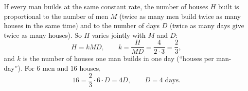 If every man builds at the same constant rate, the number of houses $H$ built is proportional to the number of men $M$ (twice as many men build twice as many houses in the same time) and to the number of days $D$ (twice as many days give twice as many houses). So $H$ varies jointly with $M$ and $D$:
\[H=kMD,\qquad k=\dfrac{H}{MD}=\dfrac{4}{2\cdot3}=\dfrac23,\]
and $k$ is the number of houses one man builds in one day (``houses per man-day''). For $6$ men and $16$ houses,
\[16=\dfrac23\cdot6\cdot D=4D,\qquad D=\boxed{4}\text{ days}.\]
